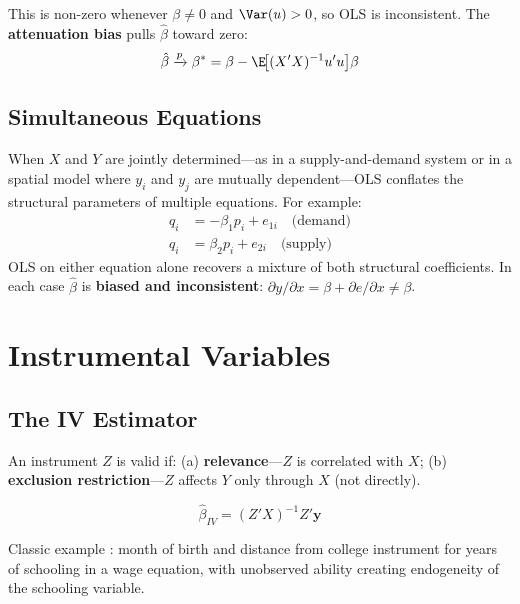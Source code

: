 This is non-zero whenever $\beta \neq 0$ and $\Var(u) > 0$, so OLS is
inconsistent. The \textbf{attenuation bias} pulls
$\hat\beta$ toward zero:
\begin{equation}
  \hat\beta \xrightarrow{p} \beta^* = \beta - \E\!\bigl[(X'X)^{-1}u'u\bigr]\beta
\end{equation}

\subsection{Simultaneous Equations}

When $X$ and $Y$ are jointly determined---as in a supply-and-demand system
or in a spatial model where $y_i$ and $y_j$ are mutually dependent---OLS
conflates the structural parameters of multiple equations. For example:
\begin{align*}
  q_i &= -\beta_1 p_i + e_{1i} \quad\text{(demand)} \\
  q_i &= \beta_2 p_i + e_{2i} \quad\text{(supply)}
\end{align*}
OLS on either equation alone recovers a mixture of both structural
coefficients. In each case $\hat\beta$ is \textbf{biased and
inconsistent}:\; $\partial y/\partial x = \beta + \partial e/\partial x
\neq \beta$.


\section{Instrumental Variables}
\label{sec_IV}

\subsection{The IV Estimator}

An instrument $Z$ is valid if: (a) \textbf{relevance}---$Z$ is correlated
with $X$; (b) \textbf{exclusion restriction}---$Z$ affects $Y$ only through
$X$ (not directly).

\begin{tcolorbox}[keyresult]
\begin{equation}
  \hat\beta_{IV} = (Z'X)^{-1}Z'\mathbf{y}
  \label{eq_IV}
\end{equation}
\end{tcolorbox}

Classic example \citep{Angrist1991}: month of birth and distance from
college instrument for years of schooling in a wage equation, with unobserved
ability creating endogeneity of the schooling variable.

